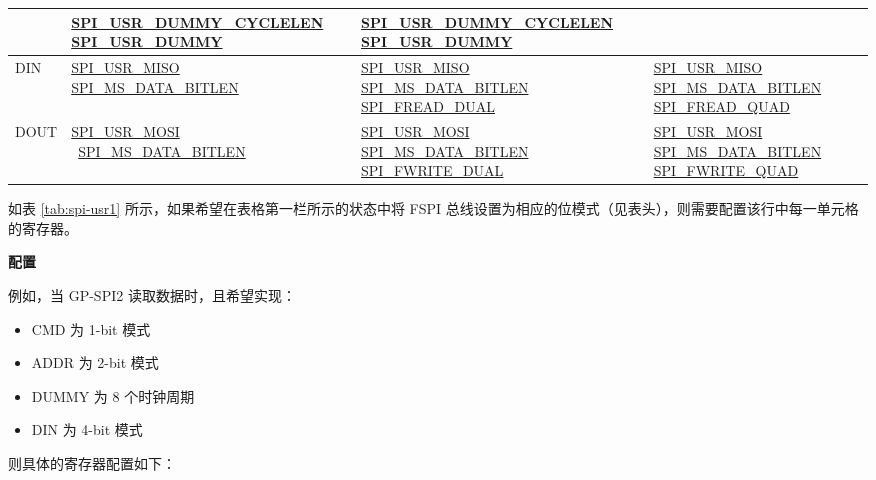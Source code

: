 \documentclass[main\_\_CN.tex]{subfiles}
\begin{document}
\begin{longtable}[c]{ |L{1.3cm}|L{4.8cm}|L{4.8cm}|L{4.8cm}| }
     &\hyperref[fielddesc:SPIUSRDUMMYCYCLELEN]{SPI\_USR\_DUMMY\_CYCLELEN}    \hyperref[fielddesc:SPIUSRDUMMY]{SPI\_USR\_DUMMY} &
    \hyperref[fielddesc:SPIUSRDUMMYCYCLELEN]{SPI\_USR\_DUMMY\_CYCLELEN}    \hyperref[fielddesc:SPIUSRDUMMY]{SPI\_USR\_DUMMY}\\
     \hline
DIN  &\hyperref[fielddesc:SPIUSRMISO]{SPI\_USR\_MISO}
      \hyperref[fielddesc:SPIMSDATABITLEN]{SPI\_MS\_DATA\_BITLEN}
     &\hyperref[fielddesc:SPIUSRMISO]{SPI\_USR\_MISO}
     \hyperref[fielddesc:SPIMSDATABITLEN]{SPI\_MS\_DATA\_BITLEN}
    \hyperref[fielddesc:SPIFREADDUAL]{SPI\_FREAD\_DUAL}
     &\hyperref[fielddesc:SPIUSRMISO]{SPI\_USR\_MISO}
     \hyperref[fielddesc:SPIMSDATABITLEN]{SPI\_MS\_DATA\_BITLEN}
    \hyperref[fielddesc:SPIFREADQUAD]{SPI\_FREAD\_QUAD}\\
     \hline
DOUT &\hyperref[fielddesc:SPIUSRMOSI]{SPI\_USR\_MOSI}       \
      \hyperref[fielddesc:SPIMSDATABITLEN]{SPI\_MS\_DATA\_BITLEN}
     &\hyperref[fielddesc:SPIUSRMOSI]{SPI\_USR\_MOSI}
     \hyperref[fielddesc:SPIMSDATABITLEN]{SPI\_MS\_DATA\_BITLEN}      \hyperref[fielddesc:SPIFWRITEDUAL]{SPI\_FWRITE\_DUAL} &
    \hyperref[fielddesc:SPIUSRMOSI]{SPI\_USR\_MOSI}
     \hyperref[fielddesc:SPIMSDATABITLEN]{SPI\_MS\_DATA\_BITLEN}      \hyperref[fielddesc:SPIFWRITEQUAD]{SPI\_FWRITE\_QUAD} \\
     \hline
\end{longtable}

如表 \ref{tab:spi-usr1} 所示，如果希望在表格第一栏所示的状态中将 FSPI 总线设置为相应的位模式（见表头），则需要配置该行中每一单元格的寄存器。

\textbf{配置}

例如，当 GP-SPI2 读取数据时，且希望实现：
\begin{itemize}
    \item CMD 为 1-bit 模式
    \item ADDR 为 2-bit 模式
    \item DUMMY 为 8 个时钟周期
    \item DIN 为 4-bit 模式
\end{itemize}
则具体的寄存器配置如下：
\end{document}
